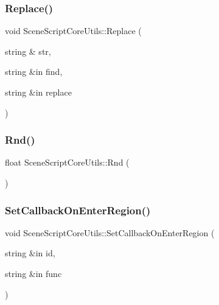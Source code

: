 \hypertarget{class_scene_script_core_utils_ac29aa08f8bec088a811e17c32df2ae1e}{}\label{class_scene_script_core_utils_ac29aa08f8bec088a811e17c32df2ae1e} 
\subsubsection{\texorpdfstring{Replace()}{Replace()}}
{\footnotesize\ttfamily void Scene\+Script\+Core\+Utils\+::\+Replace (\begin{DoxyParamCaption}\item[{string \&}]{str,  }\item[{string \&in}]{find,  }\item[{string \&in}]{replace }\end{DoxyParamCaption})}

\hypertarget{class_scene_script_core_utils_a0ad6eabfa539ad83e39b51f4c9949009}{}\label{class_scene_script_core_utils_a0ad6eabfa539ad83e39b51f4c9949009} 
\subsubsection{\texorpdfstring{Rnd()}{Rnd()}}
{\footnotesize\ttfamily float Scene\+Script\+Core\+Utils\+::\+Rnd (\begin{DoxyParamCaption}{ }\end{DoxyParamCaption})}

\hypertarget{class_scene_script_core_utils_a2722a33db0a0fa3a0d5d8bbf41249257}{}\label{class_scene_script_core_utils_a2722a33db0a0fa3a0d5d8bbf41249257} 
\subsubsection{\texorpdfstring{Set\+Callback\+On\+Enter\+Region()}{SetCallbackOnEnterRegion()}}
{\footnotesize\ttfamily void Scene\+Script\+Core\+Utils\+::\+Set\+Callback\+On\+Enter\+Region (\begin{DoxyParamCaption}\item[{string \&in}]{id,  }\item[{string \&in}]{func }\end{DoxyParamCaption})}

